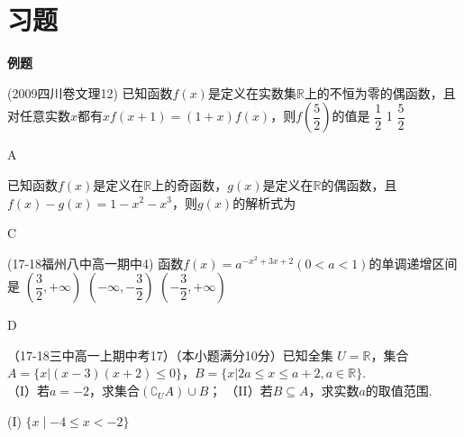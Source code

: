   \newtheorem*{Theorem}{定理}
  \makefront
\vspace{-1.5em}
\startexercise

\section{习题}
  \begin{exercise}{\large \bf 例\hspace{0.6em}题}
    \item%
      (2009四川卷文理12) 已知函数$f(x)$是定义在实数集$\mathbb{R}$上的不恒为零的偶函数，且对任意实数$x$都有$xf(x+1)=(1+x)f(x) $，则$f(\dfrac{5}{2}) $的值是\xz
      {$\dfrac12$}
      {1}
      {$\dfrac52$}
      \begin{answer}
      A
      \end{answer}
    \item%
      已知函数$f(x)$是定义在$\mathbb{R}$上的奇函数，$g(x)$是定义在$\mathbb{R} $的偶函数，且$f(x)-g(x)=1-x^2-x^3 $，则$g(x) $的解析式为\xz
      \begin{answer}
      C
      \end{answer}
    \item%
      (17-18福州八中高一期中4)
      函数$f(x)=a^{-x^2+3x+2}(0<a<1)$的单调递增区间是\xz
        {$(\dfrac32,+\infty)$}
        {$(-\infty,-\dfrac32)$}
        {$(-\dfrac32,+\infty)$}
      \begin{answer}
      D
      \end{answer}
    \item%
      （17-18三中高一上期中考17）（本小题满分10分）已知全集 $U=\mathbb{R}$，集合$A=\{x|(x-3)(x+2)\leq0\} $，$B=\{x|2a\leq x\leq a+2,a\in \mathbb{R} \} $.\\
      （I）若$a=-2 $，求集合$(\complement_UA)\cup B $；
      （II）若$B\subseteq A $，求实数$a $的取值范围.
      \begin{answer}
       (I) $\{x\mid-4\leq x<-2 \} $

\end{answer}
\end{exercise}
